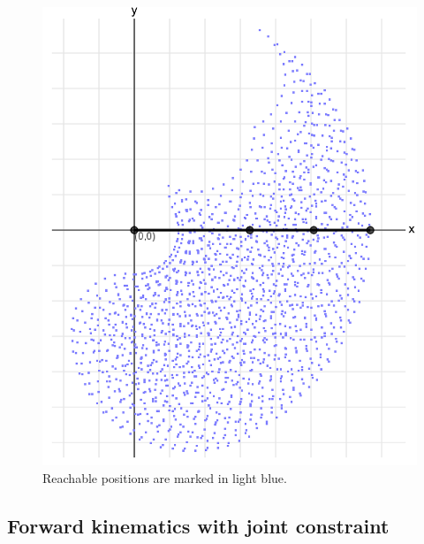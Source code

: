 \documentclass{article}
\begin{document}
\begin{figure}[h]
\centering
\includegraphics[scale=0.17]{reachable1.png}
\caption{Reachable positions are marked in light blue.}
\end{figure}

\newpage

\subsection{Forward kinematics with joint constraint}
\end{document}
